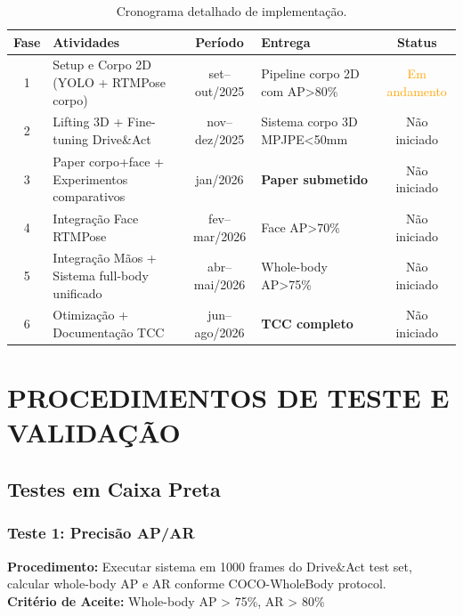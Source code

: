 \documentclass[12pt, a4paper]{article}
\begin{document}
\begin{table}[H]
    \centering
    \caption{Cronograma detalhado de implementação.}
    \label{tab:cronograma_impl}
    \small
    \begin{tabular}{|c|p{5cm}|c|p{2.5cm}|c|}
        \hline
        \textbf{Fase} & \textbf{Atividades} & \textbf{Período} & \textbf{Entrega} & \textbf{Status} \\ \hline
        
        1 & Setup e Corpo 2D (YOLO + RTMPose corpo) & set--out/2025 & Pipeline corpo 2D com AP>80\% & \textcolor{orange}{Em andamento} \\ \hline
        
        2 & Lifting 3D + Fine-tuning Drive\&Act & nov--dez/2025 & Sistema corpo 3D MPJPE<50mm & Não iniciado \\ \hline
        
        3 & Paper corpo+face + Experimentos comparativos & jan/2026 & \textbf{Paper submetido} & Não iniciado \\ \hline
        
        4 & Integração Face RTMPose & fev--mar/2026 & Face AP>70\% & Não iniciado \\ \hline
        
        5 & Integração Mãos + Sistema full-body unificado & abr--mai/2026 & Whole-body AP>75\% & Não iniciado \\ \hline
        
        6 & Otimização + Documentação TCC & jun--ago/2026 & \textbf{TCC completo} & Não iniciado \\ \hline
    \end{tabular}
\end{table}

\section{PROCEDIMENTOS DE TESTE E VALIDAÇÃO}

\subsection{Testes em Caixa Preta}

\subsubsection{Teste 1: Precisão AP/AR}

\textbf{Procedimento:} Executar sistema em 1000 frames do Drive\&Act test set, calcular whole-body AP e AR conforme COCO-WholeBody protocol.\\
\textbf{Critério de Aceite:} Whole-body AP > 75\%, AR > 80\%
\end{document}
